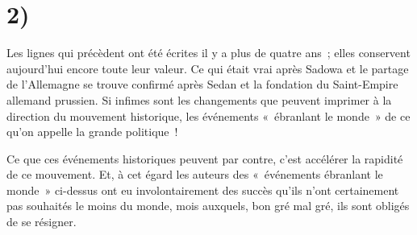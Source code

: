 \documentclass[french,twoside]{book} %
\begin{document}
\section[{2)}]{2)}
\noindent Les lignes qui précèdent ont été écrites il y a plus de quatre ans ; elles conservent aujourd’hui encore toute leur valeur. Ce qui était vrai après Sadowa et le partage de l’Allemagne se trouve confirmé après Sedan et la fondation du Saint-Empire allemand prussien. Si infimes sont les changements que peuvent imprimer à la direction du mouvement historique, les événements « ébranlant le monde » de ce qu’on appelle la grande politique !\par
Ce que ces événements historiques peuvent par contre, c’est accélérer la rapidité de ce mouvement. Et, à cet égard les auteurs des « événements ébranlant le monde » ci-dessus ont eu involontairement des succès qu’ils n’ont certainement pas souhaités le moins du monde, mois auxquels, bon gré mal gré, ils sont obligés de se résigner.\par
\end{document}
